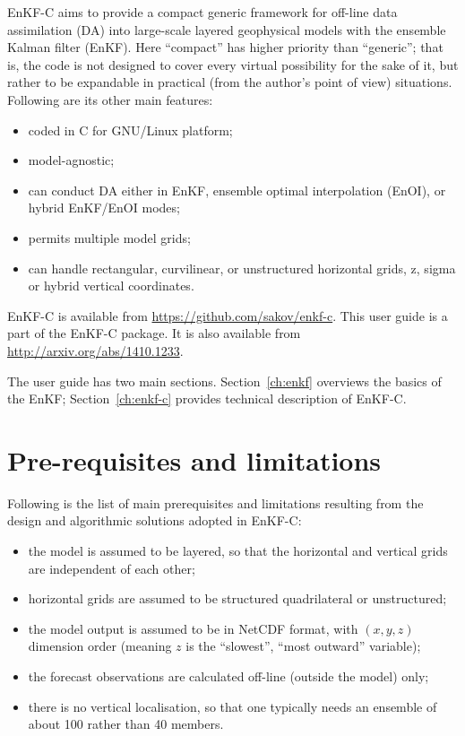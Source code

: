 \documentclass[11pt]{report}
\begin{document}
EnKF-C aims to provide a compact generic framework for off-line data assimilation (DA) into large-scale layered geophysical models with the ensemble Kalman filter (EnKF).
Here ``compact'' has higher priority than ``generic''; that is, the code is not designed to cover every virtual possibility for the sake of it, but rather to be expandable in practical (from the author's point of view) situations.
Following are its other main features:
\begin{itemize}
\item coded in C for GNU/Linux platform;
\item model-agnostic;
\item can conduct DA either in EnKF, ensemble optimal interpolation (EnOI), or hybrid EnKF/EnOI modes;
\item permits multiple model grids;
\item can handle rectangular, curvilinear, or unstructured horizontal grids, z, sigma or hybrid vertical coordinates.
\end{itemize}

EnKF-C is available from \url{https://github.com/sakov/enkf-c}.
This user guide is a part of the EnKF-C package. 
It is also available from \url{http://arxiv.org/abs/1410.1233}.

The user guide has two main sections.
Section~\ref{ch:enkf} overviews the basics of the EnKF; Section~\ref{ch:enkf-c} provides technical description of EnKF-C.

\section*{Pre-requisites and limitations}

Following is the list of main prerequisites and limitations resulting from the design and algorithmic solutions adopted in EnKF-C:
\begin{itemize}
\item the model is assumed to be layered, so that the horizontal and vertical grids are independent of each other;
\item horizontal grids are assumed to be structured quadrilateral or unstructured;
\item the model output is assumed to be in NetCDF format, with $(x, y, z)$ dimension order (meaning $z$ is the ``slowest'', ``most outward'' variable);
\item the forecast observations are calculated off-line (outside the model) only;
\item there is no vertical localisation, so that one typically needs an ensemble of about 100 rather than 40 members.
\end{itemize}
\end{document}
